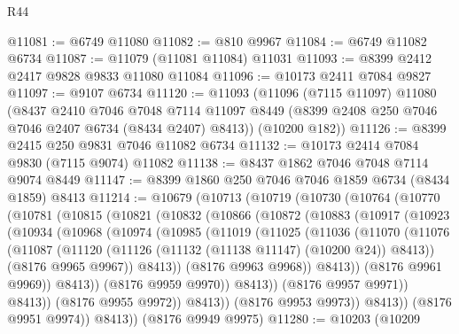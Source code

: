 \begin{lexlean}{R44}
\begin{coremodule}
{@11081 := @6749 @11080
@11082 := @810 @9967
@11084 := @6749 @11082 @6734
@11087 := @11079 (@11081 @11084) @11031
@11093 := @8399 @2412 @2417 @9828 @9833 @11080 @11084
@11096 := @10173 @2411 @7084 @9827
@11097 := @9107 @6734
@11120 := @11093
    (@11096
      (@7115 @11097)
      @11080
      (@8437
        @2410
        @7046
        @7048
        @7114
        @11097
        @8449
        (@8399 @2408 @250 @7046 @7046 @2407 @6734 (@8434 @2407) @8413))
      (@10200 @182))
@11126 := @8399 @2415 @250 @9831 @7046 @11082 @6734
@11132 := @10173 @2414 @7084 @9830 (@7115 @9074) @11082
@11138 := @8437 @1862 @7046 @7048 @7114 @9074 @8449
@11147 := @8399 @1860 @250 @7046 @7046 @1859 @6734 (@8434 @1859) @8413
@11214 := @10679
    (@10713
      (@10719
        (@10730
          (@10764
            (@10770
              (@10781
                (@10815
                  (@10821
                    (@10832
                      (@10866
                        (@10872
                          (@10883
                            (@10917
                              (@10923
                                (@10934
                                  (@10968
                                    (@10974
                                      (@10985
                                        (@11019
                                          (@11025
                                            (@11036
                                              (@11070
                                                (@11076
                                                  (@11087
                                                    (@11120
                                                      (@11126
                                                        (@11132 (@11138 @11147) (@10200 @24))
                                                        @8413))
                                                    (@8176 @9965 @9967))
                                                  @8413))
                                              (@8176 @9963 @9968))
                                            @8413))
                                        (@8176 @9961 @9969))
                                      @8413))
                                  (@8176 @9959 @9970))
                                @8413))
                            (@8176 @9957 @9971))
                          @8413))
                      (@8176 @9955 @9972))
                    @8413))
                (@8176 @9953 @9973))
              @8413))
          (@8176 @9951 @9974))
        @8413))
    (@8176 @9949 @9975)
@11280 := @10203
    (@10209
}
\end{coremodule}
\end{lexlean}
